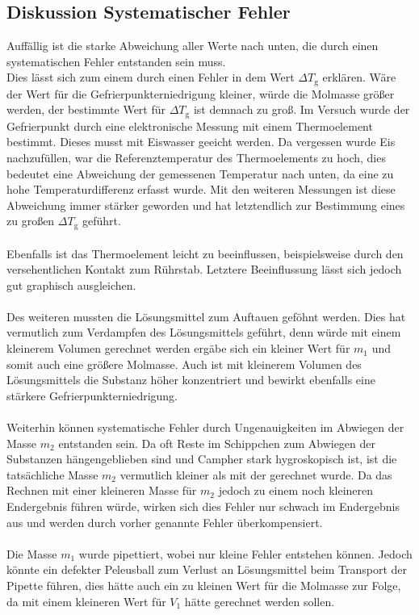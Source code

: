 \documentclass[12pt,a4paper,titlepage,headinclude,bibtotoc]{scrartcl}
\begin{document}
\subsection{Diskussion Systematischer Fehler}
Auffällig ist die starke Abweichung aller Werte nach unten, die durch einen systematischen Fehler entstanden sein muss.\\
Dies lässt sich zum einem durch einen Fehler in dem Wert $\Delta T_\mathrm{g}$ erklären. Wäre der Wert für die Gefrierpunkterniedrigung kleiner, würde die Molmasse größer werden, der bestimmte Wert für $\Delta T_\mathrm{g}$ ist demnach zu groß. Im Versuch wurde der Gefrierpunkt durch eine elektronische Messung mit einem Thermoelement bestimmt. Dieses musst mit Eiswasser geeicht werden. Da vergessen wurde Eis nachzufüllen, war die Referenztemperatur des Thermoelements zu hoch, dies bedeutet eine Abweichung der gemessenen Temperatur nach unten, da eine zu hohe Temperaturdifferenz erfasst wurde.  Mit den weiteren Messungen ist diese Abweichung immer stärker geworden und  hat letztendlich zur Bestimmung eines zu großen $\Delta T_\mathrm{g}$ geführt.\\\\ 
Ebenfalls ist das Thermoelement leicht zu beeinflussen, beispielsweise durch den versehentlichen Kontakt zum Rührstab. Letztere Beeinflussung lässt sich jedoch gut graphisch ausgleichen.\\\\
Des weiteren mussten die Lösungsmittel zum Auftauen geföhnt werden. Dies hat vermutlich zum Verdampfen des Lösungsmittels geführt, denn würde mit einem kleinerem Volumen gerechnet werden ergäbe sich ein kleiner Wert für $m_1$ und somit auch eine größere Molmasse. Auch ist mit kleinerem Volumen des Lösungsmittels die Substanz höher konzentriert und bewirkt ebenfalls eine stärkere Gefrierpunkterniedrigung.\\\\
Weiterhin können systematische Fehler durch Ungenauigkeiten im Abwiegen der Masse $m_2$ entstanden sein. Da oft Reste im Schippchen zum Abwiegen der Substanzen hängengeblieben sind und Campher stark hygroskopisch ist, ist die tatsächliche Masse $m_2$ vermutlich kleiner als mit der gerechnet wurde. Da das Rechnen mit einer kleineren Masse für $m_2$ jedoch zu einem noch kleineren Endergebnis führen würde, wirken sich dies Fehler nur schwach im Endergebnis aus und werden durch vorher genannte Fehler überkompensiert.\\\\
Die Masse $m_1$ wurde pipettiert, wobei nur kleine Fehler entstehen können. Jedoch könnte ein defekter Peleusball zum Verlust an Lösungsmittel beim Transport der Pipette führen, dies hätte auch ein zu kleinen Wert für die Molmasse zur Folge, da mit einem kleineren Wert für $V_1$ hätte gerechnet werden sollen. \\\\  
\end{document}
